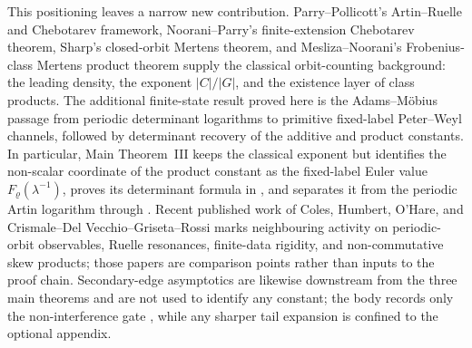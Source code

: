 This positioning leaves a narrow new contribution.  Parry--Pollicott's
Artin--Ruelle and Chebotarev framework, Noorani--Parry's finite-extension
Chebotarev theorem, Sharp's closed-orbit Mertens theorem, and
Mesliza--Noorani's Frobenius-class Mertens product theorem supply the classical
orbit-counting background: the leading density, the exponent \(|C|/|G|\), and
the existence layer of class products.  The additional finite-state result
proved here is the Adams--M\"obius passage from periodic determinant logarithms
to primitive fixed-label Peter--Weyl channels, followed by determinant recovery
of the additive and product constants.  In particular, Main Theorem~III keeps
the classical exponent but identifies the non-scalar coordinate of the product
constant as the fixed-label Euler value \(F_\varrho(\lambda^{-1})\), proves its
determinant formula in ,
and separates it from the periodic Artin logarithm through
.
Recent published work of Coles, Humbert, O'Hare, and Crismale--Del
Vecchio--Griseta--Rossi marks neighbouring activity on periodic-orbit
observables, Ruelle resonances, finite-data rigidity, and non-commutative skew
products; those papers are comparison points rather than inputs to the proof
chain.  Secondary-edge asymptotics are likewise downstream from the three main
theorems and are not used to identify any constant; the body records only the
non-interference gate , while
any sharper tail expansion is confined to the optional appendix.

